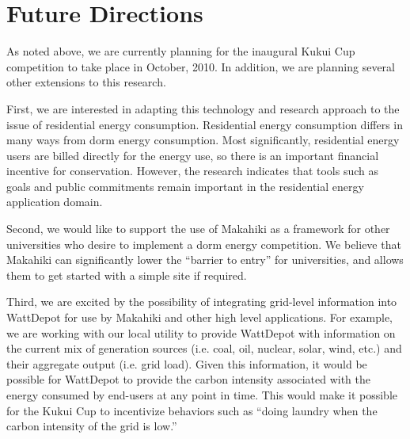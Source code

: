 
\section{Future Directions}
\label{sec:future-directions}

As noted above, we are currently planning for the inaugural Kukui Cup
competition to take place in October, 2010.  In addition, we are planning
several other extensions to this research.

First, we are interested in adapting this technology and research approach
to the issue of residential energy consumption.  Residential energy
consumption differs in many ways from dorm energy consumption. Most
significantly, residential energy users are billed directly for the energy
use, so there is an important financial incentive for conservation.
However, the research indicates that tools such as goals and public
commitments remain important in the residential energy application domain.

Second, we would like to support the use of Makahiki as a framework for
other universities who desire to implement a dorm energy competition.  We
believe that Makahiki can significantly lower the ``barrier to entry'' for
universities, and allows them to get started with a simple site if required. 

Third, we are excited by the possibility of integrating grid-level
information into WattDepot for use by Makahiki and other high level
applications.  For example, we are working with our local utility to
provide WattDepot with information on the current mix of generation sources
(i.e. coal, oil, nuclear, solar, wind, etc.) and their aggregate output
(i.e. grid load).  Given this information, it would be possible for
WattDepot to provide the carbon intensity associated with the energy
consumed by end-users at any point in time.  This would make it possible
for the Kukui Cup to incentivize behaviors such as ``doing laundry when the
carbon intensity of the grid is low.''





